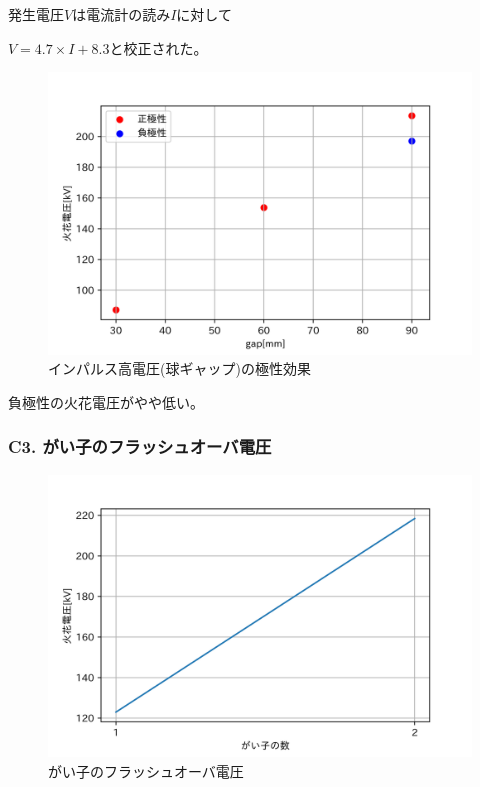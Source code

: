 \documentclass[dvipdfmx, twocolumn]{jsarticle}
\begin{document}
発生電圧$V$は電流計の読み$I$に対して

$V = 4.7\times I +8.3$と校正された。

\begin{figure}[H]
\begin{center}
\includegraphics[scale = 0.5]{C2.png}
\caption{インパルス高電圧(球ギャップ)の極性効果}
\end{center}
\end{figure}
負極性の火花電圧がやや低い。
\subsubsection*{C3. がい子のフラッシュオーバ電圧}
\begin{figure}[H]
\begin{center}
\includegraphics[scale = 0.5]{C3.png}
\caption{がい子のフラッシュオーバ電圧}
\end{center}
\end{figure}
\end{document}
